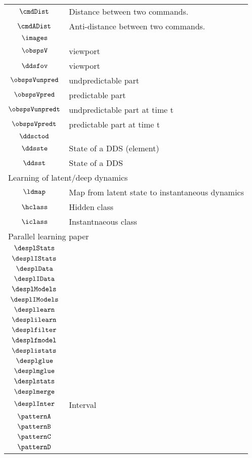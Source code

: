 \begin{longtable}{cl}
 $\cmdDist$ &  Distance between two commands.\\ 
 $\cmdADist$ &  Anti-distance between two commands.\\ 
 $\images$ & \\ 
 $\obspsV$ &  viewport\\ 
 $\ddsfov$ &  viewport\\ 
 $\obspsVunpred$ &  undpredictable part\\ 
 $\obspsVpred$ &  predictable part \\ 
 $\obspsVunpredt$ &  undpredictable part at time t\\ 
 $\obspsVpredt$ &  predictable part at time t\\ 
 $\ddsctod$ & \\ 
 $\ddsste$ &  State of a DDS (element)\\ 
 $\ddsst$ &  State of a DDS\\ 
 \multicolumn{2}{l}{Learning of latent/deep dynamics}\\ 
 \hline
$\ldmap$ &  Map from latent state to instantaneous dynamics\\ 
 $\hclass$ &  Hidden class\\ 
 $\iclass$ &  Instantnaeous class\\ 
 \multicolumn{2}{l}{Parallel learning paper}\\ 
 \hline
$\desplStats$ & \\ 
 $\desplIStats$ & \\ 
 $\desplData$ & \\ 
 $\desplIData$ & \\ 
 $\desplModels$ & \\ 
 $\desplIModels$ & \\ 
 $\despllearn$ & \\ 
 $\desplilearn$ & \\ 
 $\desplfilter$ & \\ 
 $\desplfmodel$ & \\ 
 $\desplistats$ & \\ 
 $\desplglue$ & \\ 
 $\desplmglue$ & \\ 
 $\desplstats$ & \\ 
 $\desplmerge$ & \\ 
 $\desplInter$ &  Interval\\ 
 $\patternA$ & \\ 
 $\patternB$ & \\ 
 $\patternC$ & \\ 
 $\patternD$ & \\ 

\end{longtable}
